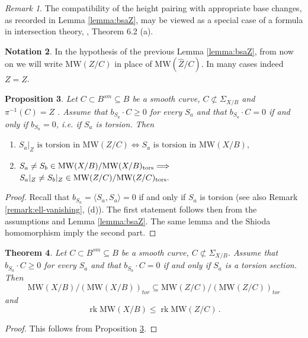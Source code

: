 \documentclass[11pt]{amsart}
\newtheorem{theorem}{Theorem}[section]
\newtheorem{proposition}[theorem]{Proposition}
\theoremstyle{definition}
\theoremstyle{definition}
\theoremstyle{remark}
\newtheorem{remark}[theorem]{Remark}
\theoremstyle{remark}
\theoremstyle{definition}
\newtheorem{notation}[theorem]{Notation}
\theoremstyle{conjecture}
\newcommand{\MW}{\mathrm{MW}}
\begin{document}
\begin{remark}
The
compatibility of the height pairing with appropriate base changes, as
recorded in Lemma \ref{lemma:bsaZ}, may be viewed as a special case of a formula
in intersection theory, \cite{Fulton}, Theorem
6.2 (a).
\end{remark}


\begin{notation} \label{remark_notation} In the hypothesis of the previous Lemma \ref{lemma:bsaZ}, from now on  we will write $\MW(Z/C)$ in place of 
$\MW({\widehat Z}/C)$. In many cases  indeed $Z = \widehat Z$.
\end{notation}

\begin{proposition}\label{prop:InjMW} Let $C \subset B^{sm} \subseteq B$ be a smooth curve, $C \not \subset  \Sigma_{X/B}$ and %
$\pi^{-1}(C)=Z$%
. Assume  that $b_{S_a} \cdot C \geq 0$ for every $S_a$ and that
$b_{S_a} \cdot C = 0$ if and only if $b_{S_a}=0$, i.e. if $S_a$ is torsion.
Then 
\begin{enumerate}
    \item $ 
S_a|_Z \text{ is  torsion in } \MW(Z/C) \Longleftrightarrow  S_a \text{ is  torsion in } \MW(X/B), $
\item $ S_a \neq S_b \in \MW(X/B)/\MW(X/B)_{\rm tors} \Longrightarrow $\\
$S_a|_Z \neq S_b|_Z  \in \MW(Z/C)/\MW(Z/C)_{\rm tors}.
$
\end{enumerate}
  
\end{proposition}

\begin{proof}
  Recall that $
  b_{S_a}=
\langle S_a, S_a \rangle = 0$ if and only if $ S_a$  is torsion (see also Remark \ref{remark:ell-vanishing}, (d)). The first statement follows then  from  the assumptions and Lemma \ref{lemma:bsaZ}.   The same lemma and the  Shioda homomorphism  imply the second part.
\end{proof}




\begin{theorem}\label{thm:InjMW}
Let $C \subset B^{sm} \subseteq B$ be a smooth curve, $C \not \subset  \Sigma_{X/B}$. Assume  that $b_{S_a} \cdot C \geq 0$ for every $S_a$ and
that $b_{S_a} \cdot C = 0$ if and only if ${S_a}$ is a torsion section. Then
\[\MW(X/B)/( \MW(X/B))_{tor} \subseteq  \MW(Z/C)/ (\MW(Z/C))_{tor}
\]
and
\[ 
\operatorname{rk} \MW(X/B) \leq \operatorname{rk} \MW(Z/C)   \,.
\]
\end{theorem}
\begin{proof} This follows from  Proposition \ref{prop:InjMW}. 
\end{proof}
\end{document}
